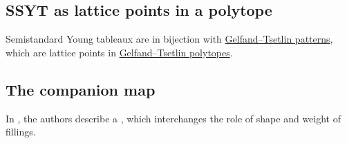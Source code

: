 \subsection[prelimTableauxAsPolytope]{SSYT as lattice points in a polytope}

Semistandard Young tableaux are in bijection with
\hyperref[gtpatternsAsSSYT]{Gelfand--Tsetlin patterns}, which are lattice
points in \hyperref[gtPolytope]{Gelfand--Tsetlin polytopes}.


\subsection[companionMap]{The companion map}

In \cite[Def.~15]{KaliszewskiMorse2019}, the authors describe a ,
which interchanges the role of shape and weight of fillings.
